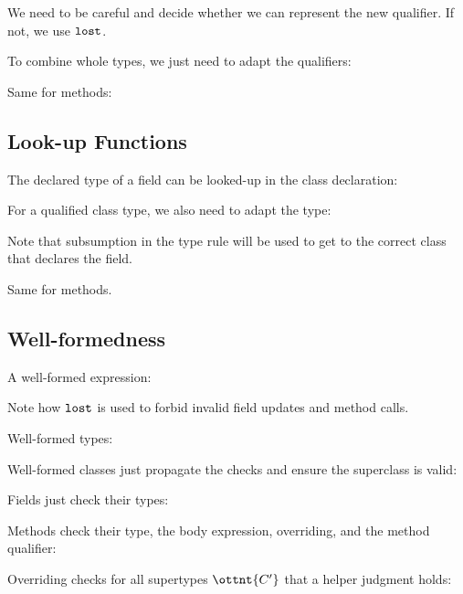 We need to be careful and decide whether we can represent the new
qualifier. If not, we use $ \texttt{\upshape{lost}\,\!} $.

\ottdefnqcombqrules


To combine whole types, we just need to adapt the qualifiers:

\ottdefnqcombtrules


Same for methods:

\ottdefnqcombmsrules



\subsection{Look-up Functions}

The declared type of a field can be looked-up in the class
declaration:

\ottdefnsftypec


For a qualified class type, we also need to adapt the type:

\ottdefnsftypet


Note that subsumption in the type rule will be used to get to the
correct class that declares the field.

Same for methods.

\ottdefnsmsigc


\ottdefnsmsigt


\subsection{Well-formedness}

A well-formed expression:

\ottdefntyperules


Note how $ \texttt{\upshape{lost}\,\!} $ is used to forbid invalid field updates and method
calls.


Well-formed types:

\ottdefnwftype


Well-formed classes just propagate the checks and ensure the
superclass is valid:

\ottdefnwfclass


Fields just check their types:

\ottdefnwffd


Methods check their type, the body expression, overriding, and the
method qualifier:

\ottdefnwfmd


Overriding checks for all supertypes $\ottnt{C'}$ that a helper judgment
holds:

